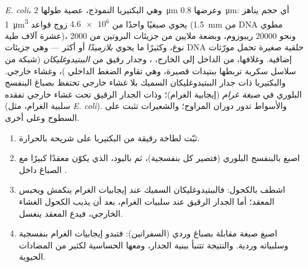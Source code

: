 \begin{proposition}\label{prop:b1:cell-unit-of-life:bacterium}
\emph{E. coli}، وهي البكتيريا النموذج، عصية طولها \qty{2}{\micro m}
وعرضها \qty{0.8}{\micro m}: أي حجم يناهز \qty{1}{\micro m^3} يحوي
صبغيًا واحدًا من $\num{4.6e6}$ زوج قواعد (\qty{1.5}{mm} من DNA مطوي
عشرة آلاف طية)، ونحو \num{20000} ريبوزوم، وبضعة ملايين من جزيئات
البروتين من \num{2000} نوع، وكثيرًا ما يحوي
\emph{بلازميدًا} أو أكثر --- وهي جزيئات DNA حلقية
صغيرة تحمل مورّثات إضافية. وغلافها، من الداخل إلى الخارج، ، وجدار رقيق من \emph{الببتيدوغليكان}
(شبكة من سلاسل سكرية تربطها ببتيدات قصيرة، وهي تقاوم الضغط الداخلي
)، وغشاء خارجي. والبكتيريا ذات جدار الببتيدوغليكان السميك بلا
غشاء خارجي تحتفظ بصباغ البنفسج البلوري في \emph{صبغة
غرام} (إيجابية الغرام)؛ وذات الجدار الرقيق تحت غشاء
خارجي تفقده (سلبية الغرام، مثل \emph{E. coli}). والأسواط تدور دوران
المراوح؛ والشعيرات تثبت  على السطوح وعلى  أخرى.
\end{proposition}

\begin{method}\label{met:b1:cell-unit-of-life:gram}
\begin{enumerate}
  \item ثبّت لطاخة رقيقة من البكتيريا على شريحة بالحرارة.
  \item اصبغ بالبنفسج البلوري (فتصير كل  بنفسجية)، ثم باليود،
        الذي يكوّن معقدًا كبيرًا مع الصباغ داخل .
  \item اشطف بالكحول: فالببتيدوغليكان السميك عند إيجابيات الغرام
        ينكمش ويحبس المعقد؛ أما الجدار الرقيق عند سلبيات الغرام،
        بعد أن يذيب الكحول الغشاء الخارجي، فيدع المعقد ينغسل.
  \item اصبغ صبغة مقابلة بصباغ وردي (السفرانين): فتبدو إيجابيات
        الغرام بنفسجية وسلبياته وردية. والنتيجة تتنبأ ببنية الجدار،
        ومعها الحساسية لكثير من المضادات الحيوية.
\end{enumerate}
\end{method}

